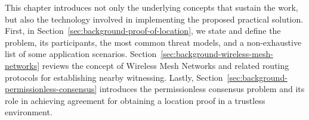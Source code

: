 This chapter introduces not only the underlying concepts that sustain the work, but also the technology involved in implementing the proposed practical solution. First, in Section~\ref{sec:background-proof-of-location}, we state and define the \pol{} problem, its participants, the most common threat models, and a non-exhaustive list of some application scenarios. Section~\ref{sec:background-wireless-mesh-networks} reviews the concept of Wireless Mesh Networks and related routing protocols for establishing nearby witnessing. Lastly, Section~\ref{sec:background-permissionless-consensus} introduces the permissionless consensus problem and its role in achieving agreement for obtaining a location proof in a trustless environment.
